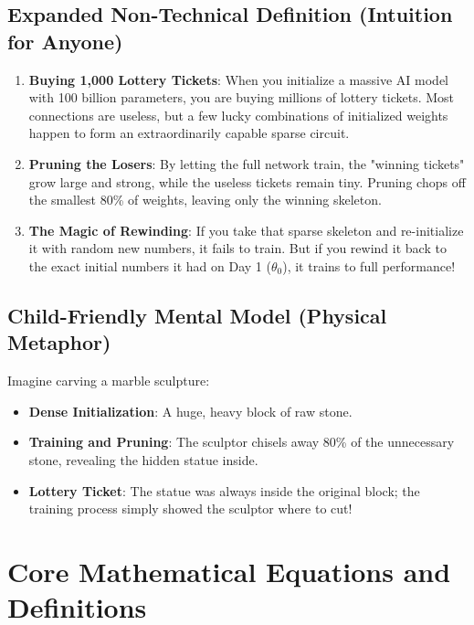 \documentclass[11pt,a4paper]{article}
\theoremstyle{definition}
\begin{document}
\subsection{Expanded Non-Technical Definition (Intuition for Anyone)}
\begin{enumerate}
    \item \textbf{Buying 1,000 Lottery Tickets}: When you initialize a massive AI model with 100 billion parameters, you are buying millions of lottery tickets. Most connections are useless, but a few lucky combinations of initialized weights happen to form an extraordinarily capable sparse circuit.
    \item \textbf{Pruning the Losers}: By letting the full network train, the "winning tickets" grow large and strong, while the useless tickets remain tiny. Pruning chops off the smallest 80\% of weights, leaving only the winning skeleton.
    \item \textbf{The Magic of Rewinding}: If you take that sparse skeleton and re-initialize it with random new numbers, it fails to train. But if you rewind it back to the exact initial numbers it had on Day 1 ($\theta_0$), it trains to full performance!
\end{enumerate}

\subsection{Child-Friendly Mental Model (Physical Metaphor)}
Imagine carving a marble sculpture:
\begin{itemize}
    \item \textbf{Dense Initialization}: A huge, heavy block of raw stone.
    \item \textbf{Training and Pruning}: The sculptor chisels away 80\% of the unnecessary stone, revealing the hidden statue inside.
    \item \textbf{Lottery Ticket}: The statue was always inside the original block; the training process simply showed the sculptor where to cut!
\end{itemize}

\section{Core Mathematical Equations and Definitions}
\end{document}
